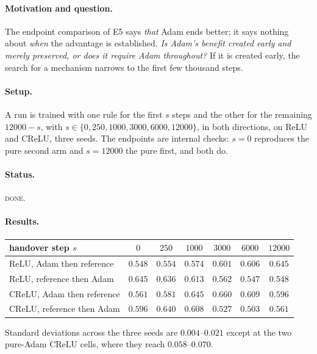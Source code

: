 \documentclass{article} %
\theoremstyle{plain}
\theoremstyle{definition}
\theoremstyle{remark}
\begin{document}
\paragraph{Motivation and question.}
The endpoint comparison of E5 says \emph{that} Adam ends better; it says nothing about \emph{when}
the advantage is established. \emph{Is Adam's benefit created early and merely preserved, or does it
require Adam throughout?} If it is created early, the search for a mechanism narrows to the first
few thousand steps.

\paragraph{Setup.}
A run is trained with one rule for the first $s$ steps and the other for the remaining $12000 - s$,
with $s \in \{0, 250, 1000, 3000, 6000, 12000\}$, in both directions, on ReLU and CReLU, three
seeds. The endpoints are internal checks: $s=0$ reproduces the pure second arm and $s=12000$ the
pure first, and both do.

\paragraph{Status.} \textsc{done}.

\paragraph{Results.}

\begin{center}\small
\begin{tabular}{lcccccc}
\toprule
handover step $s$ & $0$ & $250$ & $1000$ & $3000$ & $6000$ & $12000$ \\
\midrule
ReLU, Adam then reference  & $0.548$ & $0.554$ & $0.574$ & $0.601$ & $0.606$ & $0.645$ \\
ReLU, reference then Adam  & $0.645$ & $0.636$ & $0.613$ & $0.562$ & $0.547$ & $0.548$ \\
\midrule
CReLU, Adam then reference & $0.561$ & $0.581$ & $0.645$ & $\mathbf{0.660}$ & $0.609$ & $0.596$ \\
CReLU, reference then Adam & $0.596$ & $0.640$ & $0.608$ & $0.527$ & $0.503$ & $0.561$ \\
\bottomrule
\end{tabular}
\end{center}

\noindent Standard deviations across the three seeds are $0.004$--$0.021$ except at the two pure-Adam
CReLU cells, where they reach $0.058$--$0.070$.
\end{document}
